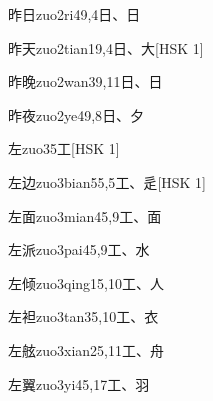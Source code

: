 \begin{entry}{昨日}{zuo2ri4}{9,4}{⽇、⽇}
\end{entry}

\begin{entry}{昨天}{zuo2tian1}{9,4}{⽇、⼤}[HSK 1]
\end{entry}

\begin{entry}{昨晚}{zuo2wan3}{9,11}{⽇、⽇}
\end{entry}

\begin{entry}{昨夜}{zuo2ye4}{9,8}{⽇、⼣}
\end{entry}

\begin{entry}{左}{zuo3}{5}{⼯}[HSK 1]
\end{entry}

\begin{entry}{左边}{zuo3bian5}{5,5}{⼯、⾡}[HSK 1]
\end{entry}

\begin{entry}{左面}{zuo3mian4}{5,9}{⼯、⾯}
\end{entry}

\begin{entry}{左派}{zuo3pai4}{5,9}{⼯、⽔}
\end{entry}

\begin{entry}{左倾}{zuo3qing1}{5,10}{⼯、⼈}
\end{entry}

\begin{entry}{左袒}{zuo3tan3}{5,10}{⼯、⾐}
\end{entry}

\begin{entry}{左舷}{zuo3xian2}{5,11}{⼯、⾈}
\end{entry}

\begin{entry}{左翼}{zuo3yi4}{5,17}{⼯、⽻}
\end{entry}

